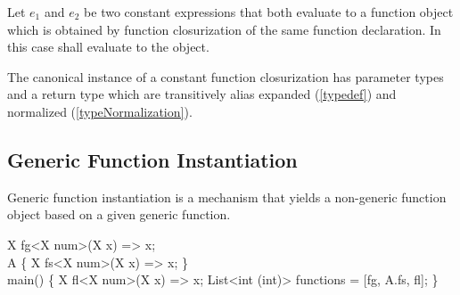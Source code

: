 \documentclass[makeidx]{article}
\begin{document}
{\LMHash{}%
Let $e_1$ and $e_2$ be two constant expressions that both
evaluate to a function object which is obtained by function closurization
of the same function declaration.
In this case 
shall evaluate to the \TRUE{} object.


\LMHash{}%
The canonical instance of a constant function closurization has
parameter types and a return type
which are transitively alias expanded
(\ref{typedef})
and normalized
(\ref{typeNormalization}).


\subsection{Generic Function Instantiation}


\LMHash{}%
Generic function instantiation is a mechanism that yields
a non-generic function object based on a given generic function.


\begin{dartCode}
X fg<X \EXTENDS{} num>(X x) => x;
\\
\CLASS{} A \{
  \STATIC{} X fs<X \EXTENDS{} num>(X x) => x;
\}
\\
\VOID{} main() \{
  X fl<X \EXTENDS{} num>(X x) => x;
  List<int \FUNCTION{}(int)> functions = [fg, A.fs, fl];
\}
\end{dartCode}

}
\end{document}
